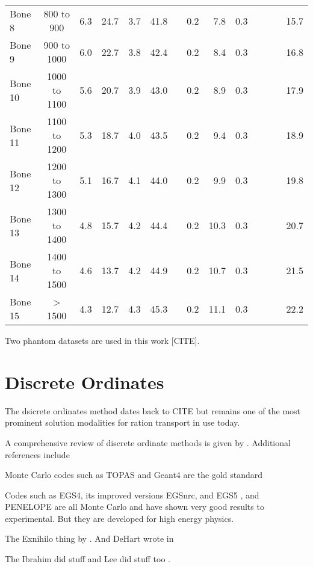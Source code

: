 \begin{sidewaystable}[ht]
\begin{tabular}{l c r r r r r r r r r r r r}
Bone 8      & 800 to 900    &  6.3 & 24.7 &  3.7 & 41.8 &     & 0.2 &  7.8 & 0.3 &     &     &     & 15.7 \\ 
Bone 9      & 900 to 1000   &  6.0 & 22.7 &  3.8 & 42.4 &     & 0.2 &  8.4 & 0.3 &     &     &     & 16.8 \\ 
Bone 10     & 1000 to 1100  &  5.6 & 20.7 &  3.9 & 43.0 &     & 0.2 &  8.9 & 0.3 &     &     &     & 17.9 \\ 
Bone 11     & 1100 to 1200  &  5.3 & 18.7 &  4.0 & 43.5 &     & 0.2 &  9.4 & 0.3 &     &     &     & 18.9 \\ 
Bone 12     & 1200 to 1300  &  5.1 & 16.7 &  4.1 & 44.0 &     & 0.2 &  9.9 & 0.3 &     &     &     & 19.8 \\
Bone 13     & 1300 to 1400  &  4.8 & 15.7 &  4.2 & 44.4 &     & 0.2 & 10.3 & 0.3 &     &     &     & 20.7 \\
Bone 14     & 1400 to 1500  &  4.6 & 13.7 &  4.2 & 44.9 &     & 0.2 & 10.7 & 0.3 &     &     &     & 21.5 \\  
Bone 15     & > 1500        &  4.3 & 12.7 &  4.3 & 45.3 &     & 0.2 & 11.1 & 0.3 &     &     &     & 22.2 \\[1ex]
\hline
\end{tabular}
\label{table:ctmap}
\end{sidewaystable}

Two phantom datasets are used in this work [CITE].

\section{Discrete Ordinates}\label{sec:discordlit}
The dsicrete ordinates method dates back to CITE but remains one of the most prominent solution modalities for ration transport in use today.

A comprehensive review of discrete ordinate methods is given by \citet{ref:lewise}. Additional references include 

Monte Carlo codes such as TOPAS and Geant4 \citep{ref:agostinellis} are the gold standard \citep{ref:jiax}

Codes such as EGS4, its improved versions EGSnrc, and EGS5 \citep{ref:nelsonw}, and PENELOPE \citep{ref:salvatf} are all Monte Carlo and have shown very good results to experimental. But they are developed for high energy physics.


The Exnihilo thing by \citet{ref:evanst}. And DeHart wrote in \citep{ref:dehartm}

The Ibrahim did stuff \citep{ref:ibrahima} and Lee did stuff too \citep{ref:leeb}.

